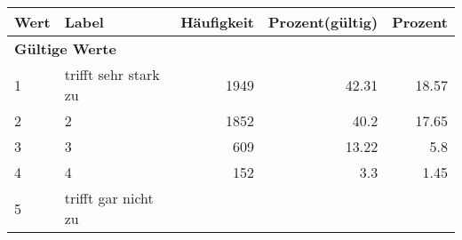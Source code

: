      \begin{longtable}{lXrrr}
     \toprule
     \textbf{Wert} & \textbf{Label} & \textbf{Häufigkeit} & \textbf{Prozent(gültig)} & \textbf{Prozent} \\
     \endhead
     \midrule
     \multicolumn{5}{l}{\textbf{Gültige Werte}}\\

     1 &
     \multicolumn{1}{X}{ trifft sehr stark zu   } &


       \num{1949} &
       \num[round-mode=places,round-precision=2]{42,31} &
         \num[round-mode=places,round-precision=2]{18,57} \\

     2 &
     \multicolumn{1}{X}{ 2   } &


       \num{1852} &
       \num[round-mode=places,round-precision=2]{40,2} &
         \num[round-mode=places,round-precision=2]{17,65} \\

     3 &
     \multicolumn{1}{X}{ 3   } &


       \num{609} &
       \num[round-mode=places,round-precision=2]{13,22} &
         \num[round-mode=places,round-precision=2]{5,8} \\

     4 &
     \multicolumn{1}{X}{ 4   } &


       \num{152} &
       \num[round-mode=places,round-precision=2]{3,3} &
         \num[round-mode=places,round-precision=2]{1,45} \\

     5 &
     \multicolumn{1}{X}{ trifft gar nicht zu   } &



\end{longtable}
